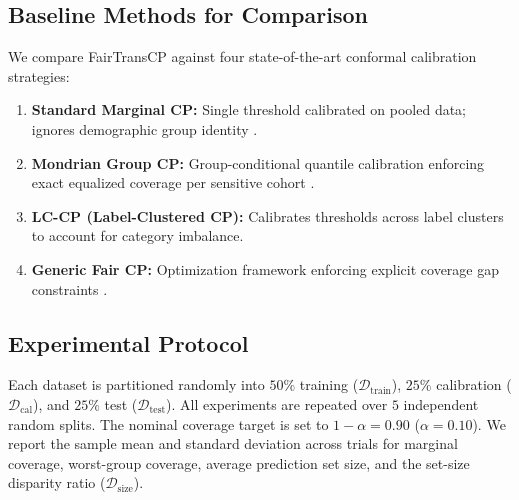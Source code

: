 \documentclass[conference]{IEEEtran}
\begin{document}
\subsection{Baseline Methods for Comparison}
We compare FairTransCP against four state-of-the-art conformal calibration strategies:
\begin{enumerate}
    \item \textbf{Standard Marginal CP:} Single threshold calibrated on pooled data; ignores demographic group identity \cite{romano2020classification}.
    \item \textbf{Mondrian Group CP:} Group-conditional quantile calibration enforcing exact equalized coverage per sensitive cohort \cite{vovk2005algorithmic}.
    \item \textbf{LC-CP (Label-Clustered CP):} Calibrates thresholds across label clusters to account for category imbalance.
    \item \textbf{Generic Fair CP:} Optimization framework enforcing explicit coverage gap constraints \cite{hardt2016equality}.
\end{enumerate}

\subsection{Experimental Protocol}
Each dataset is partitioned randomly into $50\%$ training ($\mathcal{D}_{\text{train}}$), $25\%$ calibration ($\mathcal{D}_{\text{cal}}$), and $25\%$ test ($\mathcal{D}_{\text{test}}$). All experiments are repeated over $5$ independent random splits. The nominal coverage target is set to $1 - \alpha = 0.90$ ($\alpha = 0.10$). We report the sample mean and standard deviation across trials for marginal coverage, worst-group coverage, average prediction set size, and the set-size disparity ratio ($\mathcal{D}_{\text{size}}$).
\end{document}

